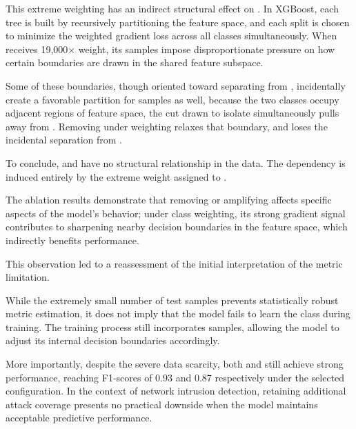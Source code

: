 This extreme weighting has an indirect structural effect on . In XGBoost, each tree is built by recursively partitioning the feature space, and each split is chosen to minimize the weighted gradient loss across all classes simultaneously. When  receives 19,000× weight, its samples impose disproportionate pressure on how certain boundaries are drawn in the shared feature subspace.

\vspace{1.5cm}

Some of these boundaries, though oriented toward separating  from , incidentally create a favorable partition for  samples as well, because the two classes occupy adjacent regions of feature space, the cut drawn to isolate  simultaneously pulls  away from . Removing  under weighting relaxes that boundary, and  loses the incidental separation from .

To conclude,  and  have no structural relationship in the data. The dependency is induced entirely by the extreme weight assigned to .

The ablation results demonstrate that removing or amplifying  affects specific aspects of the model’s behavior; under class weighting, its strong gradient signal contributes to sharpening nearby decision boundaries in the feature space, which indirectly benefits  performance.

This observation led to a reassessment of the initial interpretation of the metric limitation.

While the extremely small number of test samples prevents statistically robust metric estimation, it does not imply that the model fails to learn the class during training. The training process still incorporates  samples, allowing the model to adjust its internal decision boundaries accordingly.

More importantly, despite the severe data scarcity, both  and  still achieve strong performance, reaching F1-scores of 0.93 and 0.87 respectively under the selected configuration. In the context of network intrusion detection, retaining additional attack coverage presents no practical downside when the model maintains acceptable predictive performance.

